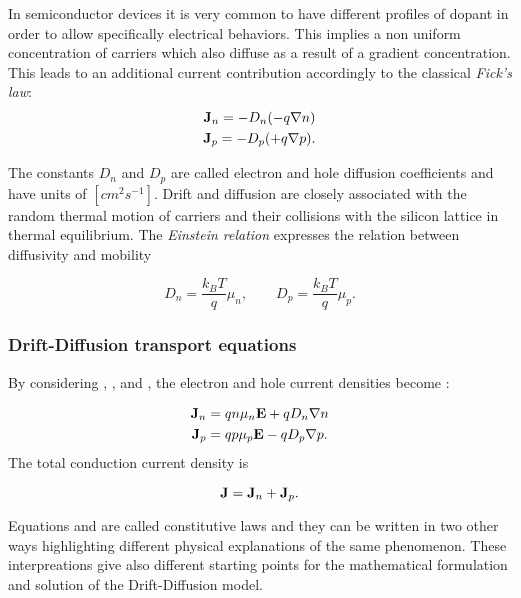 In semiconductor devices it is very common to have different profiles of dopant in order to allow specifically electrical behaviors. This implies a non uniform concentration of carriers which also diffuse as a result of a gradient concentration. This leads to an additional current contribution accordingly to the classical \textit{Fick's law}:
\begin{align}
\mathbf{J}_n = -D_n(-q\nabla n) \label{eq: diff electron}\\
\mathbf{J}_p = -D_p(+q\nabla p) . \label{eq: diff hole}
\end{align}

The constants $D_n$ and $D_p$ are called electron and hole diffusion coefficients and have units of $[cm^2s^{-1}]$. Drift and diffusion are closely associated with the random thermal motion of carriers and their collisions with the silicon lattice in thermal equilibrium. The \textit{Einstein relation}  expresses the relation between diffusivity and mobility

\begin{equation}
\label{eq: einstein relation}
D_n = \dfrac{k_BT}{q}\mu_n, \qquad D_p = \dfrac{k_BT}{q}\mu_p.
\end{equation}

\subsubsection{Drift-Diffusion transport equations}
\label{subsub:driftdiffusion transport}

By considering , ,  and , the electron and hole current densities become \cite{selberherr:SimSem}:

\begin{align}
\mathbf{J}_n &= qn\mu_n\mathbf{E} + qD_n\nabla n  \label{eq: drift diff electron}\\ 
\mathbf{J}_p &= qp\mu_p\mathbf{E} - qD_p \nabla p. \label{eq: drift diff hole}
\end{align}
The total conduction current density is

\begin{equation*}
\mathbf{J}=\mathbf{J}_n+\mathbf{J}_p.
\end{equation*}


Equations  and  are called constitutive laws and they can be written in two other ways highlighting different physical explanations of the same phenomenon. These interpreations give also different starting points for the mathematical formulation and solution of the Drift-Diffusion model.

